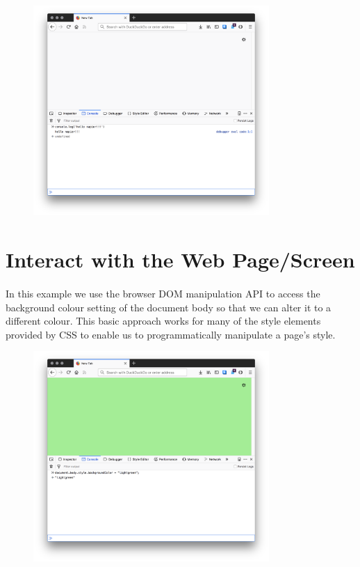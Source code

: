 \begin{figure}[H]
\centering
\includegraphics[width=0.8\textwidth]{figures/hello-napier}
\label{fig:hello-napier}
\caption{}
\end{figure}


\section{Interact with the Web Page/Screen}
\paragraph{} In this example we use the browser DOM manipulation API to access the background colour setting of the document body so that we can alter it to a different colour. This basic approach works for many of the style elements provided by CSS to enable us to programmatically manipulate a page's style.

\begin{figure}[H]
\centering
\includegraphics[width=0.8\textwidth]{figures/js-screen-interaction}
\label{fig:js-screen-interaction}
\caption{}
\end{figure}


